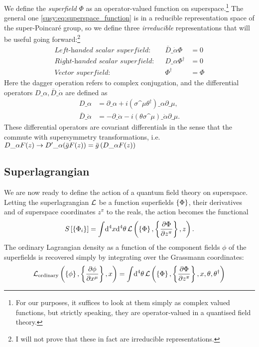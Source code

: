 \documentclass[../main.tex]{subfiles}
\begin{document}
We define the \emph{superfield} \(\Phi\) as an operator-valued function on
superspace.\footnote{For our purposes, it suffices to look at them simply as complex valued functions, but strictly speaking, they are operator-valued in a quantised field theory.} The general one \cref{susy:eq:superspace_function} is in a
reducible representation space of the super-Poincaré group, so we define three
\emph{irreducible} representations that will be useful going forward:\footnote{I will not prove that these in fact are irreducible representations.}
\begin{align}
  \textit{Left-handed scalar superfield:}  &  & \bar{D}\_{\dot\alpha}\Phi & = 0    \\
  \textit{Right-handed scalar superfield:} &  & D\_{\alpha}\Phi^\dagger   & = 0    \\
  \label{susy:eq:vector_superfield}
  \textit{Vector superfield:}              &  & \Phi^\dagger              & = \Phi
\end{align}
Here the dagger operation refers to complex conjugation, and the differential operators \(D\_\alpha, \bar{D}\_{\dot\alpha}\) are defined as
\begin{subequations}
  \begin{align}
    D\_\alpha             & = \partial\_\alpha + i(\sigma\^\mu \theta^\dagger)\_\alpha \partial\_\mu,      \\
    \bar{D}\_{\dot\alpha} & = -\partial\_{\dot\alpha} - i (\theta\sigma\^\mu)\_{\dot\alpha} \partial\_\mu.
  \end{align}
\end{subequations}
These differential operators are covariant differentials in the sense that the commute with supersymmetry transformations, i.e. \(D\_\alpha F(z) \to {D^\prime}\_\alpha (\bar{g} F(z)) = \bar{g} \pclosed{D\_\alpha F(z)}\)

\subsection{Superlagrangian}
We are now ready to define the action of a quantum field theory on superspace.
Letting the superlagrangian \(\L\) be a function superfields \(\cclosed{\Phi}\), their derivatives and of superspace coordinates \(z^\pi\) to the reals, the action becomes the functional
\begin{equation}
  S\bclosed{\cclosed{\Phi_i}} = \integral{^4x \mathrm{d}^4\theta} \L\pclosed{\cclosed{\Phi}, \cclosed{\pd[z^\pi]{\Phi}}, z}.
\end{equation}
The ordinary Lagrangian density as a function of the component fields \(\phi\) of the superfields is recovered simply by integrating over the Grassmann coordinates:
\begin{equation}
  \L_\text{ordinary}\pclosed{\cclosed{\phi}, \cclosed{\pd[x^\mu]{\phi}}, x} = \integral{^4\theta} \L\pclosed{\cclosed{\Phi}, \cclosed{\pd[z^\pi]{\Phi}}, x, \theta, \theta^\dagger}
\end{equation}
\end{document}
